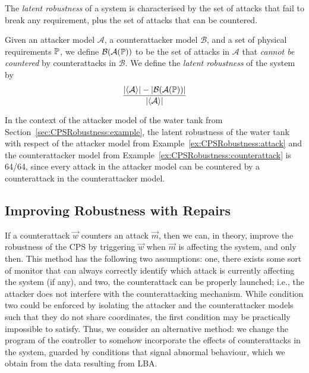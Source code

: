 {The \emph{latent robustness} of a system is characterised by the set of attacks that fail to break any requirement, plus the set of attacks that can be countered.
\begin{definition}
  \label{def:CPSRobustness:LatentRobustness}
  Given an attacker model $\mathcal{A}$, a counterattacker model $\mathcal{B}$, and a set of physical requirements $\mathbb{P}$, we define $\mathcal{B}(\mathcal{A}(\mathbb{P}))$ to be the set of attacks in $\mathcal{A}$ that \emph{cannot be countered} by counterattacks in $\mathcal{B}$. We define the \emph{latent robustness} of the system by 
  \begin{align*}
    \frac{|{{\left<\mathcal{A}\right>}}|-|\mathcal{B}(\mathcal{A}(\mathbb{P}))|}{|{{\left<\mathcal{A}\right>}}|}
  \end{align*}
\end{definition}
 
\begin{example}
  In the context of the attacker model of the water tank from Section~\ref{sec:CPSRobustness:example}, the latent robustness of the water tank with respect of the attacker model from Example~\ref{ex:CPSRobustness:attack} and the counterattacker model from Example~\ref{ex:CPSRobustness:counterattack} is 64/64, since every attack in the attacker model can be countered by a counterattack in the counterattacker model. 
\end{example}

\subsection{Improving Robustness with Repairs}
\label{sec:CPSRobustness:UrgentAttacker}
If a counterattack $\vec{w}$ counters an attack $\vec{m}$, then we can, in theory, improve the robustness of the CPS by triggering $\vec{w}$ when $\vec{m}$ is affecting the system, and only then. This method has the following two assumptions: one, there exists some sort of monitor that can always correctly identify which attack is currently affecting the system (if any), and two, the counterattack can be properly launched; i.e., the attacker does not interfere with the counterattacking mechanism. While condition two could be enforced by isolating the attacker and the counterattacker models such that they do not share coordinates, the first condition may be practically impossible to satisfy. Thus, we consider an alternative method: we change the program of the controller to somehow incorporate the effects of counterattacks in the system, guarded by conditions that signal abnormal behaviour, which we obtain from the data resulting from LBA.

}
